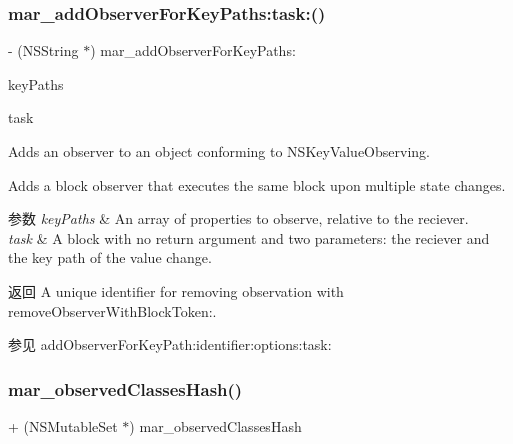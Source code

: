 \subsubsection{\texorpdfstring{mar\+\_\+add\+Observer\+For\+Key\+Paths\+:task\+:()}{mar\_addObserverForKeyPaths:task:()}}
{\footnotesize\ttfamily -\/ (N\+S\+String $\ast$) mar\+\_\+add\+Observer\+For\+Key\+Paths\+: \begin{DoxyParamCaption}\item[{(N\+S\+Array $\ast$)}]{key\+Paths }\item[{task:(void($^\wedge$)(id obj, N\+S\+String $\ast$key\+Path))}]{task }\end{DoxyParamCaption}}

Adds an observer to an object conforming to N\+S\+Key\+Value\+Observing.

Adds a block observer that executes the same block upon multiple state changes.


\begin{DoxyParams}{参数}
{\em key\+Paths} & An array of properties to observe, relative to the reciever. \\
\hline
{\em task} & A block with no return argument and two parameters\+: the reciever and the key path of the value change. \\
\hline
\end{DoxyParams}
\begin{DoxyReturn}{返回}
A unique identifier for removing observation with remove\+Observer\+With\+Block\+Token\+:. 
\end{DoxyReturn}
\begin{DoxySeeAlso}{参见}
add\+Observer\+For\+Key\+Path\+:identifier\+:options\+:task\+: 
\end{DoxySeeAlso}
\mbox{\label{category_n_s_object_07_m_a_r___observer_08_a2e0945c8f622db5c54bc2a20c8678726}} 
\subsubsection{\texorpdfstring{mar\+\_\+observed\+Classes\+Hash()}{mar\_observedClassesHash()}}
{\footnotesize\ttfamily + (N\+S\+Mutable\+Set $\ast$) mar\+\_\+observed\+Classes\+Hash \begin{DoxyParamCaption}{ }\end{DoxyParamCaption}\hspace{0.3cm}{\ttfamily [implementation]}}

